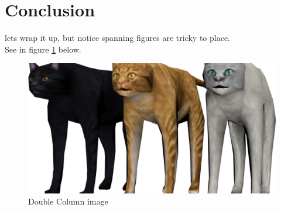 \documentclass[sigconf, screen, review]{acmart}
\begin{document}
\section{Conclusion}
\par lets wrap it up, but notice spanning figures are tricky to place.\\
See in figure \ref{fig:testtwo} below.
\begin{figure}[!h]
	\centering
	\includegraphics[width=0.7\linewidth]{images/example.png}
	\caption{Double Column image}
	\label{fig:testtwo}
\end{figure}



\end{document}

